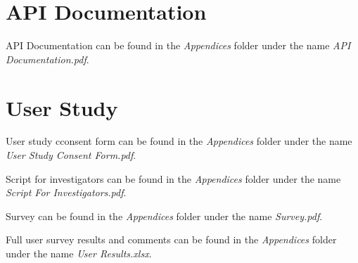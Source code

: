 \begin{appendices}

	\chapter{API Documentation} \label{app:apidoc}

		API Documentation can be found in the \emph{Appendices} folder under the
		name \emph{API Documentation.pdf}.

	\chapter{User Study} \label{app:userstudydocs}

		User study cconsent form can be found in the \emph{Appendices} folder 
		under the name \emph{User Study Consent Form.pdf}.
		
		Script for investigators can be found in the \emph{Appendices} folder 
		under the name \emph{Script For Investigators.pdf}.

		Survey can be found in the \emph{Appendices} folder under the name 
		\emph{Survey.pdf}.
		
		Full user survey results and comments can be found in the 
		\emph{Appendices} folder under the name \emph{User Results.xlsx}.

\end{appendices}